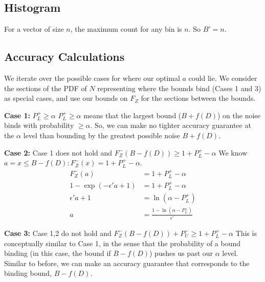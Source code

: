 \documentclass[11pt]{scrartcl} %
\begin{document}
\subsection{Histogram}
\label{subsec:Bprime_histogram}
For a vector of size $n$, the maximum count for any bin is $n$. So $B' = n$.

\begin{appendices}
	\section{Accuracy Calculations}
	\label{appendix:accuracy}
	We iterate over the possible cases for where our optimal $a$ could lie.
	We consider the sections of the PDF of $N$ representing where the bounds bind (Cases 1 and 3) as special cases, and use our bounds on
	$F_{Z}$ for the sections between the bounds.

	\textbf{Case 1:} $P_{L}^{+} \geq \alpha$ \newline
	$P_{L}^{+} \geq \alpha$ means that the largest bound ($B + f(D)$) on the noise binds with probability $\geq \alpha$.
	So, we can make no tighter accuracy guarantee at the $\alpha$ level than bounding by the greatest possible noise $B + f(D)$. \newline

	\textbf{Case 2:} Case 1 does not hold and $F^{-}_{Z}(B - f(D)) \geq 1 + P_{L}^{+} - \alpha$ \newline
	We know $a = x \leq B - f(D): F_{Z}^{-}(x) = 1 + P_{L}^{+} - \alpha$.
	\begin{align}
	              	 F_{Z}^{-}(a) &= 1 + P_{L}^{+} - \alpha \nonumber \\
		1 - \exp(-\epsilon'a + 1) &= 1 + P_{L}^{+} - \alpha \nonumber \\
		           \epsilon'a + 1 &= \ln(\alpha - P_{L}^{+}) \nonumber \\
		                        a &= \frac{1 - \ln(\alpha - P_{L}^{+})}{\epsilon'} \nonumber
	\end{align}

	\textbf{Case 3:} Case 1,2 do not hold and $F^{-}_{Z}(B - f(D)) + P_{U}^{-} \geq 1 + P_{L}^{+} - \alpha$ \newline
	This is conceptually similar to Case 1, in the sense that the probability of a bound binding (in this case, the bound if $B - f(D)$) pushes us past our
	$\alpha$ level. Similar to before, we can make an accuracy guarantee that corresponds to the binding bound, $B - f(D)$. \newline


\end{appendices}
\end{document}
